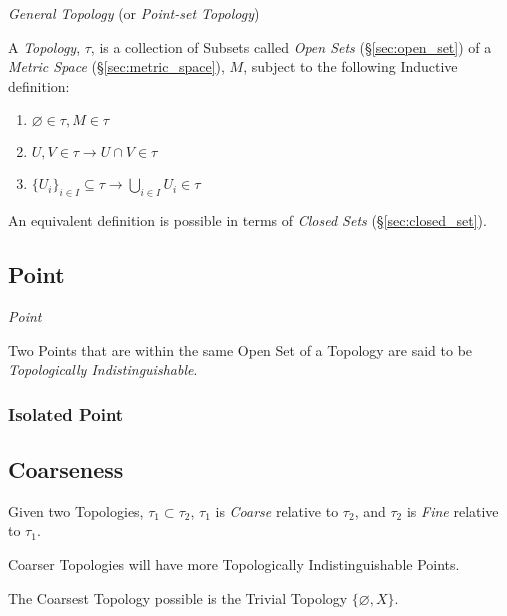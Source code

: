 \emph{General Topology} (or \emph{Point-set Topology})

A \emph{Topology}, $\tau$, is a collection of Subsets called
\emph{Open Sets} (\S\ref{sec:open_set}) of a \emph{Metric Space}
(\S\ref{sec:metric_space}), $M$, subject to the following Inductive
definition:
\begin{enumerate}
\item $\varnothing \in \tau, M \in \tau$
\item $U,V \in \tau \rightarrow U \cap V \in \tau$
\item $\{U_i\}_{i \in I} \subseteq \tau \rightarrow \bigcup_{i \in I}
  U_i \in \tau$
\end{enumerate}

An equivalent definition is possible in terms of \emph{Closed Sets}
(\S\ref{sec:closed_set}).



\subsection{Point}\label{sec:topological_point}

\emph{Point}

Two Points that are within the same Open Set of a Topology are said to
be \emph{Topologically Indistinguishable}.



\subsubsection{Isolated Point}\label{sec:isolated_point}



\subsection{Coarseness}\label{sec:coarseness}

Given two Topologies, $\tau_1 \subset \tau_2$, $\tau_1$ is
\emph{Coarse} relative to $\tau_2$, and $\tau_2$ is \emph{Fine}
relative to $\tau_1$.

Coarser Topologies will have more Topologically Indistinguishable
Points.

The Coarsest Topology possible is the Trivial Topology $\{
\varnothing, X \}$.

